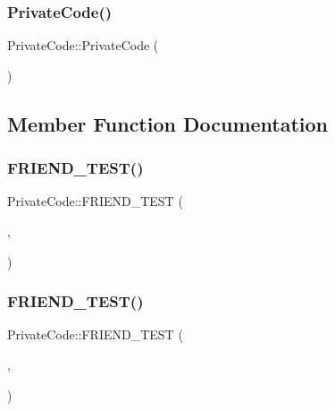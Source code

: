 \subsubsection{\texorpdfstring{Private\+Code()}{PrivateCode()}}
{\footnotesize\ttfamily Private\+Code\+::\+Private\+Code (\begin{DoxyParamCaption}{ }\end{DoxyParamCaption})}



\subsection{Member Function Documentation}
\mbox{\label{classPrivateCode_a9a74a333501232539ab1636f0928d8f2}} 
\subsubsection{\texorpdfstring{F\+R\+I\+E\+N\+D\+\_\+\+T\+E\+S\+T()}{FRIEND\_TEST()}\hspace{0.1cm}{\footnotesize\ttfamily [1/2]}}
{\footnotesize\ttfamily Private\+Code\+::\+F\+R\+I\+E\+N\+D\+\_\+\+T\+E\+ST (\begin{DoxyParamCaption}\item[{Private\+Code\+Test}]{,  }\item[{Can\+Access\+Private\+Members}]{ }\end{DoxyParamCaption})}

\mbox{\label{classPrivateCode_a29b6823300f68d78691476eeeaed8a7c}} 
\subsubsection{\texorpdfstring{F\+R\+I\+E\+N\+D\+\_\+\+T\+E\+S\+T()}{FRIEND\_TEST()}\hspace{0.1cm}{\footnotesize\ttfamily [2/2]}}
{\footnotesize\ttfamily Private\+Code\+::\+F\+R\+I\+E\+N\+D\+\_\+\+T\+E\+ST (\begin{DoxyParamCaption}\item[{Private\+Code\+Fixture\+Test}]{,  }\item[{Can\+Access\+Private\+Members}]{ }\end{DoxyParamCaption})}

